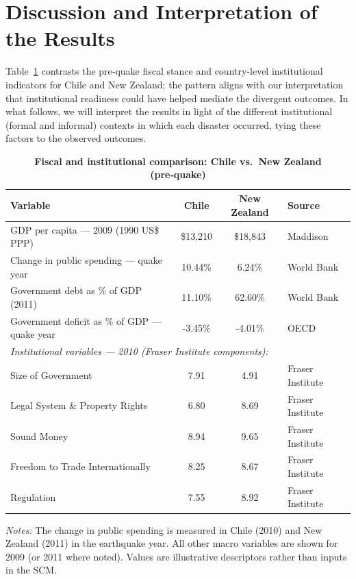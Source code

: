 \documentclass[12pt]{article}
\begin{document}
\section{Discussion and Interpretation of the Results}

Table~\ref{tab:fiscal_inst} contrasts the pre‑quake fiscal stance and country‑level institutional indicators for Chile and New Zealand; the pattern aligns with our interpretation that institutional readiness could have helped mediate the divergent outcomes. In what follows, we will interpret the results in light of the different institutional (formal and informal) contexts in which each disaster occurred, tying these factors to the observed outcomes. 

\begin{table}[H]
\centering
\caption{\textbf{Fiscal and institutional comparison: Chile vs.\ New Zealand (pre‑quake)}}
\label{tab:fiscal_inst}
\small
\setlength{\tabcolsep}{6pt}
\begin{threeparttable}
\begin{tabular}{lcc l}
\toprule
\textbf{Variable} & \textbf{Chile} & \textbf{New Zealand} & \textbf{Source} \\
\midrule
GDP per capita — 2009 (1990 US\$ PPP) & \$13{,}210 & \$18{,}843 & Maddison \\
Change in public spending — quake year & 10.44\% & 6.24\% & World Bank \\
Government debt as \% of GDP (2011) & 11.10\% & 62.60\% & World Bank \\
Government deficit as \% of GDP — quake year & -3.45\% & -4.01\% & OECD \\
\midrule
\multicolumn{4}{l}{\textit{Institutional variables — 2010 (Fraser Institute components):}} \\
Size of Government & 7.91 & 4.91 & Fraser Institute \\
Legal System \& Property Rights & 6.80 & 8.69 & Fraser Institute \\
Sound Money & 8.94 & 9.65 & Fraser Institute \\
Freedom to Trade Internationally & 8.25 & 8.67 & Fraser Institute \\
Regulation & 7.55 & 8.92 & Fraser Institute \\
\bottomrule
\end{tabular}
\begin{tablenotes}[flushleft]\footnotesize
\item \textit{Notes:} The change in public spending is measured in Chile (2010) and New Zealand (2011) in the earthquake year. All other macro variables are shown for 2009 (or 2011 where noted). Values are illustrative descriptors rather than inputs in the SCM.
\end{tablenotes}
\end{threeparttable}
\end{table}
\end{document}
